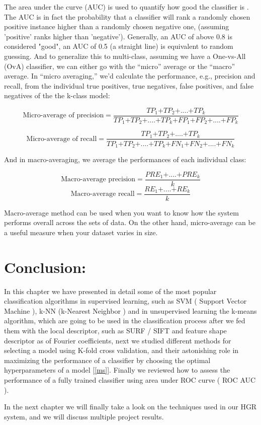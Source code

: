 The area under the curve (AUC) is used to quantify how good the classifier  is .  The AUC is in fact  the probability that a classifier will rank a randomly chosen positive instance higher than a randomly chosen negative one, (assuming 'positive' ranks higher than 'negative'). Generally, an AUC of above 0.8 is considered "good", an AUC of 0.5 (a straight line) is equivalent to random guessing.
And to generalize this to multi-class, assuming we have a One-vs-All (OvA) classifier, we can either go with the “micro” average or the “macro” average. In “micro averaging,” we’d calculate the performance, e.g., precision and recall, from the individual true positives, true negatives, false positives, and false negatives of the the k-class model:

$$\text{Micro-average of precision} = \frac{TP_{1} \bm{+} TP_{2} \bm{+}....\bm{+}TP_{k}}{TP_{1}\bm{+}TP_{2}\bm{+}....\bm{+}TP_{k}\bm{+}FP_{1}\bm{+}FP_{2}\bm{+}....\bm{+}FP_{k}} 
$$


$$
\text{Micro-average of recall} = \frac{TP_{1}\bm{+}TP_{2}\bm{+}....\bm{+}TP_{k}}{TP_{1}\bm{+}TP_{2}\bm{+}....\bm{+}TP_{k}\bm{+}FN_{1}\bm{+}FN_{2}\bm{+}....\bm{+}FN_{k}} 
$$


And in macro-averaging, we average the performances of each individual class:

$$\text{Macro-average precision} = \frac{PRE_{1}\bm{+}....\bm{+}PRE_{k}}{k} $$
$$\text{Macro-average recall} = \frac{RE_{1}\bm{+}....\bm{+}RE_{k}}{k} $$

Macro-average method can be used when you want to know how the system performs overall across the sets of data. 
On the other hand, micro-average can be a useful measure when your dataset varies in size.

\section{Conclusion:}

In this chapter we have presented in detail some of the most popular classification algorithms in supervised  learning,  such as SVM ( Support Vector Machine ), k-NN (k-Nearest Neighbor ) and in  unsupervised learning the  k-means algorithm, which are going to be used in the classification process after we fed them with the local descriptor, such as SURF / SIFT and feature shape descriptor as of Fourier coefficients, next we studied different methods for selecting  a model using K-fold cross validation, and their astonishing role in maximizing the performance of a classifier by choosing the optimal hyperparameters of a model [\ref{ms}].
Finally we reviewed  how to  assess the performance of a fully trained classifier using area under ROC curve ( ROC AUC ).

In the next chapter we will finally take a look on the techniques used in our HGR system, and we will discuss multiple  project results.    


